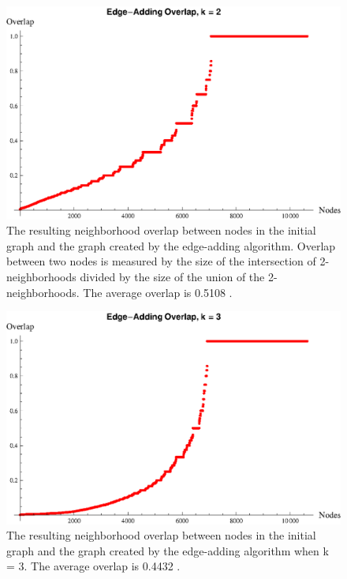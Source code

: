 \begin{figure}[htb]
\centerline{\includegraphics[scale=0.4]{s40_edge_add_k_2_overlap.eps}}
	\caption{The resulting neighborhood overlap between nodes in the initial graph and the graph created by the edge-adding algorithm. Overlap between two nodes is measured by the size of the intersection of 2-neighborhoods divided by the size of the union of the 2-neighborhoods. The average overlap is 0.5108 . }
	\label{fig:edge-adding overlap k=2}
\end{figure}

\begin{figure}[htb]
\centerline{\includegraphics[scale=0.4]{s40_edge_add_k_3_overlap.eps}}
	\caption{The resulting neighborhood overlap between nodes in the initial graph and the graph created by the edge-adding algorithm when k = 3. The average overlap is 0.4432 . }
	\label{fig:edge-adding overlap k=3}
\end{figure}

